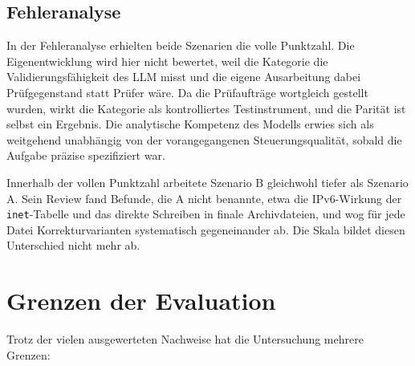 {\subsection{Fehleranalyse}
In der Fehleranalyse erhielten beide Szenarien die volle Punktzahl. Die Eigenentwicklung wird hier nicht bewertet, weil die Kategorie die Validierungsfähigkeit des \ac{LLM} misst und die eigene Ausarbeitung dabei Prüfgegenstand statt Prüfer wäre. 
Da die Prüfaufträge wortgleich gestellt wurden, wirkt die Kategorie als kontrolliertes Testinstrument, und die Parität ist selbst ein Ergebnis. Die analytische Kompetenz des Modells erwies sich als weitgehend unabhängig von der vorangegangenen Steuerungsqualität, sobald die Aufgabe präzise spezifiziert war. 

Innerhalb der vollen Punktzahl arbeitete Szenario B gleichwohl tiefer als Szenario A. Sein Review fand Befunde, die A nicht benannte, etwa die \ac{IP}v6-Wirkung der \texttt{inet}-Tabelle und das direkte Schreiben in finale Archivdateien, und wog für jede Datei Korrekturvarianten systematisch gegeneinander ab. 
Die Skala bildet diesen Unterschied nicht mehr ab.\cite{artefaktpruefungA,artefaktreviewB}

\section{Grenzen der Evaluation} \label{sec:grenzen_eval}
Trotz der vielen ausgewerteten Nachweise hat die Untersuchung mehrere Grenzen:

}
